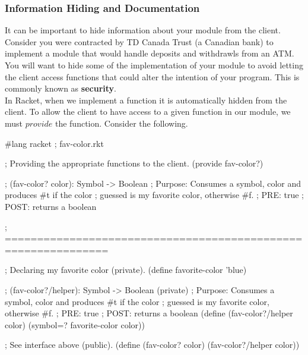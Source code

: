 
\subsubsection*{Information Hiding and Documentation}

It can be important to hide information about your module from the client. Consider you were contracted by TD Canada Trust (a Canadian bank) to implement a module that would handle deposits and withdrawls from an ATM. You will want to hide some of the implementation of your module to avoid letting the client access functions that could alter the intention of your program. This is commonly known as \textbf{security}.\\

In Racket, when we implement a function it is automatically hidden from the client. To allow the client to have access to a given function in our module, we must $provide$ the function. Consider the following.\\

\clearpage
{}

\begin{code}[Lisp]
#lang racket ; fav-color.rkt

; Providing the appropriate functions to the client.
(provide fav-color?)

; (fav-color? color): Symbol -> Boolean
; Purpose: Consumes a symbol, color and produces #t if the color
;          guessed is my favorite color, otherwise #f.
; PRE: true
; POST: returns a boolean

; ==============================================================

; Declaring my favorite color (private).
(define favorite-color 'blue)

; (fav-color?/helper): Symbol -> Boolean (private)
; Purpose: Consumes a symbol, color and produces #t if the color
;          guessed is my favorite color, otherwise #f.
; PRE: true
; POST: returns a boolean
(define (fav-color?/helper color)
	(symbol=? favorite-color color))

; See interface above (public).
(define (fav-color? color)
	(fav-color?/helper color))
\end{code}

